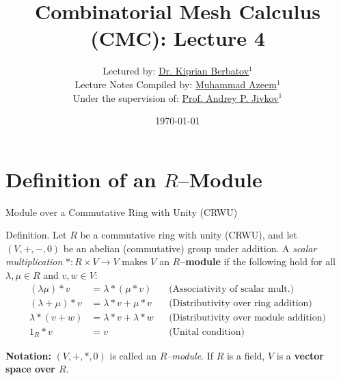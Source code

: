 \documentclass[11pt,aspectratio=43,ignorenonframetext,t]{beamer}
\title{Combinatorial Mesh Calculus (CMC): Lecture 4}
\author{Lectured by: \href{https://scholar.google.com/citations?user=x4R-snQAAAAJ&hl=en}{Dr. Kiprian Berbatov}$^1$\\
\smallskip
Lecture Notes Compiled by: \href{https://scholar.google.com/citations?user=CoIpITkAAAAJ&hl=en}{Muhammad Azeem}$^1$\\
\smallskip
Under the supervision of: \href{https://scholar.google.co.uk/citations?user=3nWJe5wAAAAJ&hl=en}{Prof. Andrey P. Jivkov}$^1$\\
\smallskip {\tiny $^1$Department of Mechanical and Aerospace Engineering, The University of Manchester, Oxford Road, Manchester M13 9PL, UK}
}
\date{\today}
\begin{document}
\begin{frame}
  \titlepage
\end{frame}

\section{Definition of an $R$–Module}

\begin{frame}{Module over a Commutative Ring with Unity (CRWU)}
\begin{block}{Definition.}  
Let $R$ be a commutative ring with unity (CRWU), and let $(V, +, -, 0)$ be an abelian (commutative) group under addition.  
A \emph{scalar multiplication} $*: R\times V \to V$ makes $V$ an \textbf{$R$–module} if the following hold for all $\lambda,\mu\in R$ and $v,w\in V$:
\[
\begin{aligned}
(\lambda\mu)*v &= \lambda*(\mu*v) && \text{(Associativity of scalar mult.)}\\
(\lambda+\mu)*v &= \lambda*v+\mu*v && \text{(Distributivity over ring addition)}\\
\lambda*(v+w) &= \lambda*v+\lambda*w && \text{(Distributivity over module addition)}\\
1_R*v &= v && \text{(Unital condition)}
\end{aligned}
\]

\textbf{Notation:} $(V,+,*,0)$ is called an \emph{$R$–module}.  
If $R$ is a field, $V$ is a \textbf{vector space over $R$}.
    
\end{block}

\end{frame}
\end{document}
